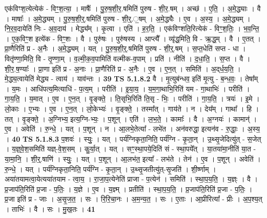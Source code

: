 \documentclass[17pt]{extarticle}
\begin{document}
                  एक॑विꣳश॒त्येत्येक॑ - विꣳ॒॒श॒त्या॒ । माषैः᳚ । पु॒रु॒ष॒शी॒र॒.षमिति॑ पुरुष - शी॒र॒.षम् । अच्छ॑ । ए॒ति॒ । अ॒मे॒द्ध्याः । वै । माषाः᳚ । अ॒मे॒द्ध्यम् । पु॒रु॒ष॒शी॒र्॒.षमिति॑ पुरुष - शी॒र्॒.॒षम् । अ॒मे॒द्ध्यैः । ए॒व । अ॒स्य॒ । अ॒मे॒द्ध्यम् । नि॒र॒व॒दायेति॑ निः - अ॒व॒दाय॑ । मेद्ध्य᳚म् । कृ॒त्वा । एति॑ । ह॒र॒ति॒ । एक॑विꣳशति॒रित्येक॑ - विꣳ॒॒श॒तिः॒ । भ॒व॒न्ति॒ । ए॒क॒विꣳ॒॒श इत्ये॑क - विꣳ॒॒शः । वै । पुरु॑षः । पुरु॑षस्य । आप्त्यै᳚ । व्यृ॑द्ध॒मिति॒ वि - ऋ॒द्ध॒म् । वै । ए॒तत् । प्रा॒णैरिति॑ प्र - अ॒नैः । अ॒मे॒द्ध्यम् । यत् । पु॒रु॒ष॒शी॒र्॒.षमिति॑ पुरुष - शी॒र्॒.षम् । स॒प्त॒धेति॑ सप्त - धा । वितृ॑ण्णा॒मिति॒ वि - तृ॒ण्णा॒म् । व॒ल्मी॒क॒व॒पामिति॑ वल्मीक-व॒पाम् । प्रति॑ । नीति॑ । द॒धा॒ति॒ । स॒प्त । वै । शी॒र॒.ष॒ण्याः᳚ । प्रा॒णा इति॑ प्र - अ॒नाः । प्रा॒णैरिति॑ प्र - अ॒नैः । ए॒व । ए॒न॒त् । समिति॑ । अ॒द्‌र्ध॒य॒ति॒ । मे॒द्ध्य॒त्वायेति॑ मेद्ध्य - त्वाय॑ । याव॑न्तः । \textbf{  39} \newline
                  \newline
                                \textbf{ TS 5.1.8.2} \newline
                  वै । मृ॒त्युब॑न्धव॒ इति॑ मृ॒त्यु - ब॒न्ध॒वः॒ । तेषा᳚म् । य॒मः । आधि॑पत्य॒मित्याधि॑ - प॒त्य॒म् । परीति॑ । इ॒या॒य॒ । य॒म॒गा॒थाभि॒रिति॑ यम - गा॒थाभिः॑ । परीति॑ । गा॒य॒ति॒ । य॒मात् । ए॒व । ए॒न॒त् । वृ॒ङ्क्ते॒ । ति॒सृभि॒रिति॑ ति॒सृ - भिः॒ । परीति॑ । गा॒य॒ति॒ । त्रयः॑ । इ॒मे । लो॒काः । ए॒भ्यः । ए॒व । ए॒न॒त् । लो॒केभ्यः॑ । वृ॒ङ्क्ते॒ । तस्मा᳚त् । गाय॑ते । न । देय᳚म् । गाथा᳚ । हि । तत् । वृ॒ङ्क्ते॒ । अ॒ग्निभ्य॒ इत्य॒ग्नि-भ्यः॒ । प॒शून् । एति॑ । ल॒भ॒ते॒ । कामाः᳚ । वै । अ॒ग्नयः॑ । कामान्॑ । ए॒व । अवेति॑ । रु॒न्धे॒ । यत् । प॒शून् । न । आ॒लभे॒तेत्या᳚ - लभे॑त । अन॑वरुद्धा॒ इत्यन॑व - रु॒द्धाः॒ । अ॒स्य॒ । \textbf{  40} \newline
                  \newline
                                \textbf{ TS 5.1.8.3} \newline
                  प॒शवः॑ । स्युः॒ । यत् । पर्य॑ग्निकृता॒निति॒ पर्य॑ग्नि - कृ॒ता॒न् । उ॒थ्सृ॒जेदित्यु॑त् - स॒जेत् । य॒ज्ञ्॒वे॒श॒समिति॑ यज्ञ्-वे॒श॒सम् । कु॒र्या॒त् । यत् । सꣳ॒॒स्था॒पये॒दिति॑ सं - स्था॒पये᳚त् । या॒तया॑मा॒नीति॑ या॒त - या॒मा॒नि॒ । शी॒र्॒.षाणि॑ । स्युः॒ । यत् । प॒शून् । आ॒लभ॑त॒ इत्या᳚ - लभ॑ते । तेन॑ । ए॒व । प॒शून् । अवेति॑ । रु॒न्धे॒ । यत् । पर्य॑ग्निकृता॒निति॒ पर्य॑ग्नि - कृ॒ता॒न् । उ॒थ्सृ॒जतीत्यु॑त्-सृ॒जति॑ । शी॒र्ष्णाम् । अया॑तयामत्वा॒येत्यया॑तयाम - त्वा॒य॒ । रा॒जा॒प॒त्येनेति॑ प्राजा - प॒त्येन॑ । समिति॑ । स्था॒प॒य॒ति॒ । य॒ज्ञ्ः । वै । प्र॒जाप॑ति॒रिति॑ प्र॒जा - प॒तिः॒ । य॒ज्ञे । ए॒व । य॒ज्ञ्म् । प्रतीति॑ । स्था॒प॒य॒ति॒ । प्र॒जाप॑ति॒रिति॑ प्र॒जा - प॒तिः॒ । प्र॒जा इति॑ प्र - जाः । अ॒सृ॒ज॒त॒ । सः । रि॒रि॒चा॒नः । अ॒म॒न्य॒त॒ । सः । ए॒ताः । आ॒प्रीरित्या᳚ - प्रीः । अ॒प॒श्य॒त् । ताभिः॑ । वै । सः । मु॒ख॒तः । \textbf{  41} \newline
\end{document}
